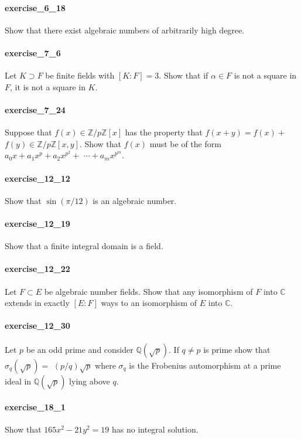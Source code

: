 \documentclass{article}
\begin{document}
\paragraph{exercise\_6\_18} Show that there exist algebraic numbers of arbitrarily high degree.

\paragraph{exercise\_7\_6} Let $K \supset F$ be finite fields with $[K: F]=3$. Show that if $\alpha \in F$ is not a square in $F$, it is not a square in $K$.

\paragraph{exercise\_7\_24} Suppose that $f(x) \in \mathbb{Z} / p \mathbb{Z}[x]$ has the property that $f(x+y)=f(x)+$ $f(y) \in \mathbb{Z} / p \mathbb{Z}[x, y]$. Show that $f(x)$ must be of the form $a_{0} x+a_{1} x^{p}+a_{2} x^{p^{2}}+$ $\cdots+a_{m} x^{p^{m}}$.

\paragraph{exercise\_12\_12} Show that $\sin (\pi / 12)$ is an algebraic number.

\paragraph{exercise\_12\_19} Show that a finite integral domain is a field.

\paragraph{exercise\_12\_22} Let $F \subset E$ be algebraic number fields. Show that any isomorphism of $F$ into $\mathbb{C}$ extends in exactly $[E: F]$ ways to an isomorphism of $E$ into $\mathbb{C}$.

\paragraph{exercise\_12\_30} Let $p$ be an odd prime and consider $\mathbb{Q}(\sqrt{p})$. If $q \neq p$ is prime show that $\sigma_{q}(\sqrt{p})=$ $(p / q) \sqrt{p}$ where $\sigma_{q}$ is the Frobenius automorphism at a prime ideal in $\mathbb{Q}(\sqrt{p})$ lying above $q$.

\paragraph{exercise\_18\_1} Show that $165 x^{2}-21 y^{2}=19$ has no integral solution.
\end{document}
